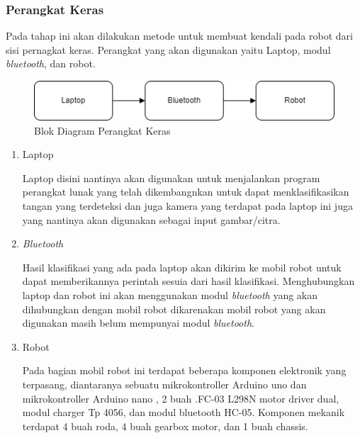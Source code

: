 \subsubsection{Perangkat Keras}
Pada tahap ini akan dilakukan metode untuk membuat kendali pada robot dari sisi pernagkat keras. Perangkat yang akan digunakan yaitu Laptop, modul \textit{bluetooth}, dan robot. 
\begin{figure}[!h]
	\centering
	\includegraphics[width=1\linewidth]{"gambar/gambar perangkat keras"}
	\caption{Blok Diagram Perangkat Keras}
	\label{fig:gambar33}
\end{figure}

\begin{enumerate}
  \item Laptop \par
  Laptop disini nantinya akan digunakan untuk menjalankan program perangkat lunak yang telah dikembangnkan untuk dapat menklasifikasikan tangan yang terdeteksi dan juga kamera yang terdapat pada laptop ini juga yang nantinya akan digunakan sebagai input gambar/citra.

  \item \textit{Bluetooth} \par
  Hasil klasifikasi yang ada pada laptop akan dikirim ke mobil robot untuk dapat memberikannya perintah sesuia dari hasil klasifikasi. Menghubungkan laptop dan robot ini akan menggunakan modul \textit{bluetooth} yang akan dihubungkan dengan mobil robot dikarenakan mobil robot yang akan digunakan masih belum mempunyai modul \textit{bluetooth}. 

  \item Robot \par
  Pada bagian mobil robot ini terdapat beberapa komponen elektronik yang terpasang, diantaranya sebuatu mikrokontroller Arduino uno dan mikrokontroller Arduino nano , 2 buah .FC-03 L298N motor driver dual, modul charger Tp 4056, dan modul bluetooth HC-05. Komponen mekanik terdapat 4 buah roda, 4 buah gearbox motor, dan 1 buah chassis.
\end{enumerate}


